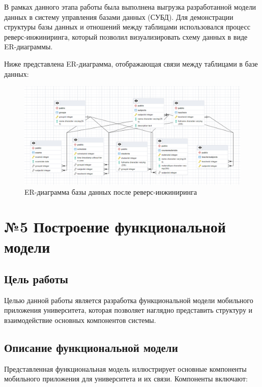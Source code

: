 \documentclass[a4paper,12pt]{article}
\begin{document}
В рамках данного этапа работы была выполнена выгрузка разработанной модели данных в систему управления базами данных (СУБД). Для демонстрации структуры базы данных и отношений между таблицами использовался процесс реверс-инжиниринга, который позволил визуализировать схему данных в виде ER-диаграммы.

Ниже представлена ER-диаграмма, отображающая связи между таблицами в базе данных:

\begin{figure}[-h]
  \centering
  \includegraphics[width=1\linewidth]{DBER.png}
  \caption{ER-диаграмма базы данных после реверс-инжиниринга}
\end{figure}

\section*{№5 Построение функциональной модели}

\subsection{Цель работы}
Целью данной работы является разработка функциональной модели мобильного приложения университета, которая позволяет наглядно представить структуру и взаимодействие основных компонентов системы.

\subsection{Описание функциональной модели}
Представленная функциональная модель иллюстрирует основные компоненты мобильного приложения для университета и их связи. Компоненты включают:
\end{document}
